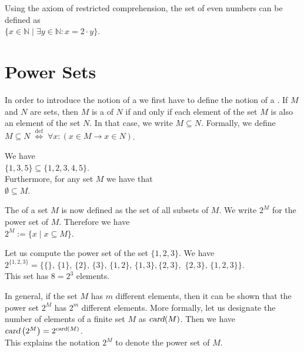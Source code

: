 \exampleEng
Using the axiom of restricted comprehension, the set of even numbers can be defined as 
\\[0.2cm]
\hspace*{1.3cm}
 $\{ x \in \mathbb{N} \;|\; \exists y\in \mathbb{N}: x = 2 \cdot y \}$. 


\section{Power Sets}
In order to introduce the notion of a  we first have to define the notion of a .
If $M$ and $N$ are sets, then $M$ is a  of $N$ if and only if each element of the
set $M$ is also an element of the set $N$.  In that case, we write $M \subseteq N$.  Formally, we define
 \\[0.2cm]
\hspace*{1.3cm}
$M \subseteq N \;\stackrel{\mathrm{def}}{\Longleftrightarrow}\; \forall x: (x \in M \rightarrow x \in N)$.

\exampleEng
We have
\\[0.2cm]
\hspace*{1.3cm}
$\{ 1, 3, 5\} \subseteq \{ 1, 2, 3, 4, 5 \}$.
\\[0.2cm]
Furthermore, for any set $M$ we have that
\\[0.2cm]
\hspace*{1.3cm}
$\emptyset \subseteq M$. \eox
\vspace*{0.2cm}

The   of a set $M$ is now defined as the set of all subsets
of $M$.  We write $2^M$ for the power set of $M$.  Therefore we have
\\[0.2cm] 
\hspace*{1.3cm}
$2^M := \{ x \;|\; x \subseteq M \}$.

\exampleEng
Let us compute the power set of the set $\{1,2,3\}$.  We have \\[0.2cm]
\hspace*{1.3cm}
 $2^{\{1,2,3\}} = \bigl\{ \{\},\, \{1\}, \, \{2\},\, \{3\},\, \{1,2\}, \, \{1,3\}, \{2,3\},\, \, \{2,3\},\,\{1,2,3\}\bigr\}$. 
\\[0.2cm]
This set has $8 = 2^3$ elements.  
\eox

In general, if the set $M$ has $m$ different elements, then it can be shown
that the power set $2^M$ has $2^m$ different elements.
More formally, let us designate the number of elements of a finite set $M$ as 
$\textsl{card}(M)$.  Then we have
\\[0.2cm]
\hspace*{1.3cm}
$\textsl{card}\left(2^M\right) = 2^{\textsl{\scriptsize card}(M)}$.
\\[0.2cm]
This explains the notation $2^M$ to denote the power set of $M$.  

